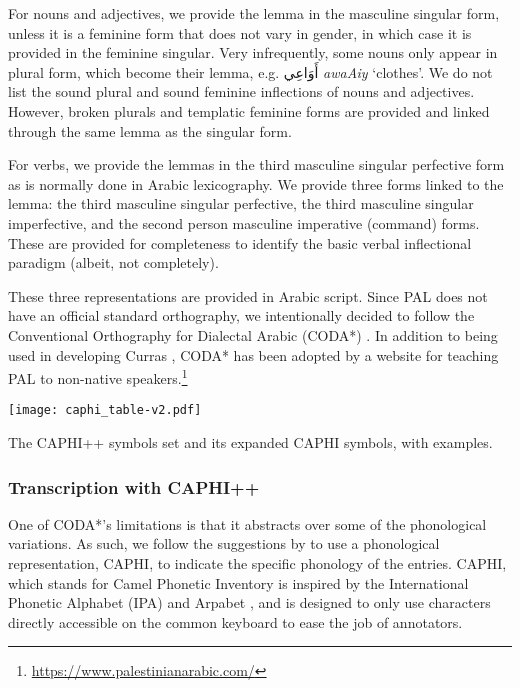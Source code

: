 For nouns and adjectives, we provide the lemma in the masculine singular form, unless it is a feminine form that does not vary in gender, in which case it is provided in the feminine singular. Very infrequently, some nouns only appear in plural form, which become their lemma, e.g. \foreignlanguage{arabic}{أَوَاعِي} {\it {\AHAMZAUP}awaA{\AYN}iy}  `clothes'.  We do not list the sound plural and sound feminine inflections of nouns and adjectives. However, broken plurals and templatic feminine forms are provided and linked through the same lemma as the singular form.

For verbs, we provide the lemmas in the third masculine singular perfective form as is normally done in Arabic lexicography. We provide three forms linked to the lemma: the third masculine singular perfective, the third masculine singular imperfective, and the second person masculine imperative (command) forms.  These are provided for completeness to identify the basic verbal inflectional paradigm (albeit, not completely).

These three representations are provided in Arabic script.
Since PAL does not have an official standard orthography, we intentionally decided to follow the Conventional Orthography for Dialectal Arabic (CODA*) \citep{Habash:2018:unified}. In addition to being used in developing Curras \citep{Jarrar:2016:curras}, CODA* has been adopted  by a website for teaching PAL to non-native speakers.\footnote{\url{https://www.palestinianarabic.com/}}

\begin{table}[t!]
    \centering
    \texttt{[image: caphi\_table-v2.pdf]}
    \caption{The CAPHI++ symbols set and its expanded CAPHI symbols, with examples.}
    \label{tab:caphiplus}
\end{table}

\subsubsection*{Transcription with CAPHI++}
One of CODA*'s limitations is that it abstracts over some of the phonological variations. As such, we follow the suggestions by \citep{Habash:2018:unified} to use a phonological representation, CAPHI, to indicate the specific phonology of the entries.  CAPHI, which stands for Camel Phonetic Inventory is inspired by the  International Phonetic Alphabet (IPA)  and Arpabet \citep{Shoup:1980:phonological}, and is designed to only use characters directly accessible on the common keyboard to ease the job of annotators.

